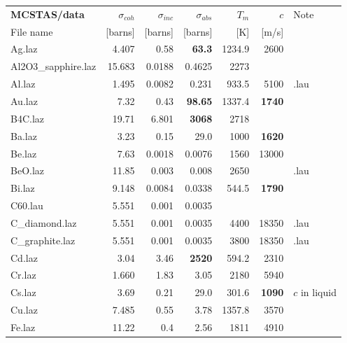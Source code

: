 \begin{table}
  \begin{center}
    {\let\my=\\
    \begin{small}
    \begin{tabular}{|l|rrr|rr|p{}|}

      \hline
      {\bf MCSTAS/data} & $\sigma_{coh}$&$\sigma_{inc}$&$\sigma_{abs}$&$T_m$       & $c$    & Note \\
          File name     & [barns]     & [barns]    & [barns]    & [K]        & [m/s] & \\
      \hline
Ag.laz             & 4.407     & 0.58     &{\bf 63.3}      &1234.9    &2600&\\
Al2O3\_sapphire.laz & 15.683    & 0.0188   &0.4625    &2273      &   &\\
Al.laz             & 1.495     & 0.0082   &0.231     &933.5     &5100& .lau\\
Au.laz             & 7.32      & 0.43     &{\bf 98.65}     &1337.4    &{\bf 1740}&\\
B4C.laz            & 19.71     & 6.801    &{\bf 3068}      &2718      &     &\\
Ba.laz             & 3.23      & 0.15     &29.0      &1000      &{\bf 1620}&\\
Be.laz             & 7.63      & 0.0018   &0.0076    &1560      &13000&\\
BeO.laz            & 11.85     & 0.003    &0.008     &2650      &   & .lau\\
Bi.laz             & 9.148     & 0.0084   &0.0338    &544.5     &{\bf 1790}&\\
C60.lau            & 5.551     & 0.001    &0.0035    &          &   &\\
C\_diamond.laz      & 5.551     & 0.001    &0.0035    &4400      &18350 & .lau\\
C\_graphite.laz     & 5.551     & 0.001    &0.0035    &3800      &18350 & .lau\\
Cd.laz             & 3.04      & 3.46     &{\bf 2520}      &594.2     &2310&\\
Cr.laz             & 1.660     & 1.83     &3.05      &2180      &5940&\\
Cs.laz             & 3.69      & 0.21     &29.0      &301.6     &{\bf 1090}  & $c$ in liquid\\
Cu.laz             & 7.485     & 0.55     &3.78      &1357.8    &3570&\\
Fe.laz             & 11.22     & 0.4      &2.56      &1811      &4910&\\

\end{tabular}
\end{small}}
\end{center}
\end{table}
